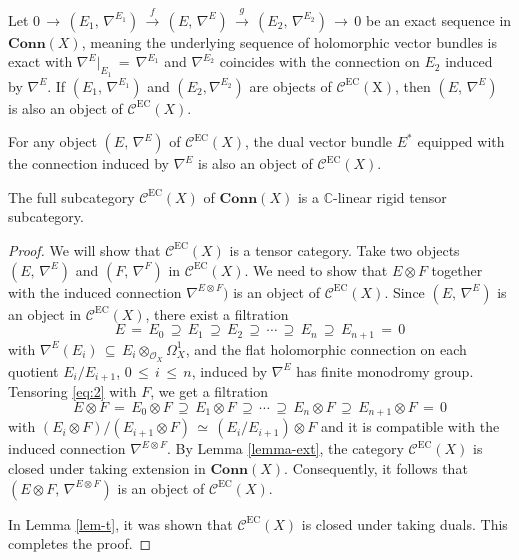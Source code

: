 \documentclass[10pt,a4paper]{amsart}
\newcommand{\C}{\mathbb{C}}
\newcommand{\EC}{\mathcal{C}^\mathrm{EC}}
\begin{document}
\begin{lemma}\label{lemma-ext}
Let $0\,\longrightarrow\, (E_1,\, \nabla^{E_1})\,\stackrel{f}{\longrightarrow}\,
(E, \,\nabla^E)\, \stackrel{g}{\longrightarrow}\, (E_2,\, \nabla^{E_2})\,\longrightarrow\, 0$
be an exact sequence in $\mathbf{Conn}(X)$, meaning the underlying sequence of holomorphic 
vector bundles
is exact with $\nabla^E\big\vert_{E_1} \,=\, \nabla^{E_1}$ and $\nabla^{E_2}$ coincides
with the connection on $E_2$ induced by $\nabla^E$.
If $(E_1,\, \nabla^{E_1})$ and $(E_2, \nabla^{E_2})$ are objects of $\mathrm{\EC(X)}$, 
then $(E, \,\nabla^E)$ is also an object of $\EC(X)$.
\end{lemma}

\begin{lemma}\label{lem-t}
For any object $(E,\, \nabla^E)$ of $\EC(X)$, the dual vector bundle $E^*$ equipped with the
connection induced by $\nabla^E$ is also an object of $\EC(X)$.
\end{lemma}

\begin{proposition}\label{prop-EC-rigid}
The full subcategory $\EC(X)$ of $\mathbf{Conn}(X)$ is a $\C$-linear rigid tensor subcategory. 
\end{proposition}

\begin{proof}
We will show that $\EC(X)$ is a tensor category. Take two objects $(E,\, \nabla^E)$ and
$(F,\, \nabla^F)$ in $\EC(X)$. We need to show that $E \otimes F$ together with the induced 
connection $\nabla^{E\otimes F})$ is an object of $\EC(X)$. 
Since $(E,\, \nabla^E)$ is an object in $\EC(X)$, there exist a filtration
\begin{equation}\label{eq:2}
E\,=\,E_0\,\supseteq\, E_1\, \supseteq\, E_2\, \supseteq\, \cdots\, \supseteq\, E_n\,\supseteq\, 
E_{n+1}\, =\, 0
\end{equation}
with $\nabla^E(E_i)\, \subseteq\, E_i \otimes_{\mathcal{O}_X} \Omega_X^1$, and the flat holomorphic
connection on each quotient $E_i/E_{i+1}$, $0\, \leq\, i\, \leq\, n$, induced by $\nabla^E$ 
has finite monodromy group. Tensoring \eqref{eq:2} with $F$, we get a filtration 
$$
E\otimes F\,=\,E_0\otimes F\,\supseteq\, E_1\otimes F\, \supseteq\, \cdots\, \supseteq\,
E_n\otimes F\,\supseteq\, E_{n+1}\otimes F\, =\, 0
$$ 
with $(E_i \otimes F)/(E_{i+1} \otimes F)\, \simeq\, (E_i/E_{i+1})\otimes F$ and it is compatible 
with the induced connection $\nabla^{E\otimes F}$. By Lemma \ref{lemma-ext}, the 
category $\EC(X)$ is closed under taking extension in $\mathbf{Conn}(X)$. Consequently, it follows 
that $(E \otimes F,\, \nabla^{E\otimes F})$ is an object of $\EC(X)$. 

In Lemma \ref{lem-t}, it was shown that $\EC(X)$ is closed under taking duals. This completes the proof.
\end{proof}
\end{document}
